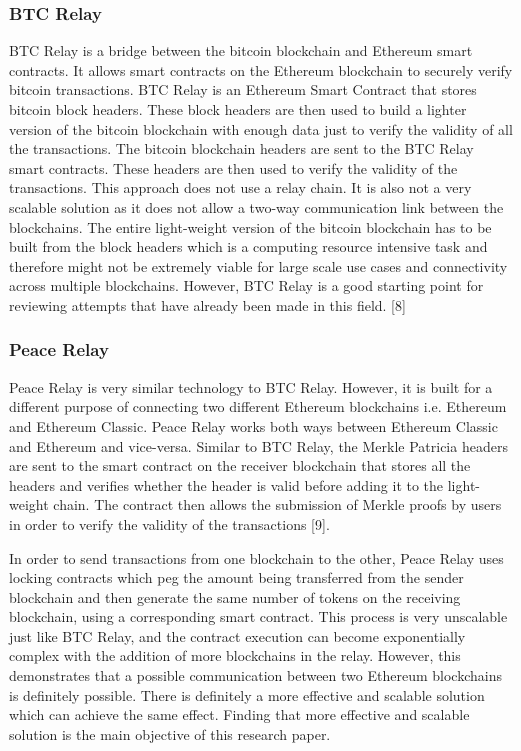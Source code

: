 \documentclass[a4paper,twoside,phd]{BYUPhys}
\begin{document}
\subsubsection{BTC Relay}
BTC Relay is a bridge between the bitcoin blockchain and Ethereum smart contracts. It allows smart contracts on the Ethereum blockchain to securely verify bitcoin transactions. BTC Relay is an Ethereum Smart Contract that stores bitcoin block headers. These block headers are then used to build a lighter version of the bitcoin blockchain with enough data just to verify the validity of all the transactions. The bitcoin blockchain headers are sent to the BTC Relay smart contracts. These headers are then used to verify the validity of the transactions. This approach does not use a relay chain. It is also not a very scalable solution as it does not allow a two-way communication link between the blockchains. The entire light-weight version of the bitcoin blockchain has to be built from the block headers which is a computing resource intensive task and therefore might not be extremely viable for large scale use cases and connectivity across multiple blockchains. However, BTC Relay is a good starting point for reviewing attempts that have already been made in this field. [8]
\subsubsection{Peace Relay}
Peace Relay is very similar technology to BTC Relay. However, it is built for a different purpose of connecting two different Ethereum blockchains i.e. Ethereum and Ethereum Classic. Peace Relay works both ways between Ethereum Classic and Ethereum and vice-versa. Similar to BTC Relay, the Merkle Patricia headers are sent to the smart contract on the receiver blockchain that stores all the headers and verifies whether the header is valid before adding it
to the light-weight chain. The contract then allows the submission of Merkle proofs by users in order to verify the validity of the transactions [9]. \par
In order to send transactions from one blockchain to the other, Peace Relay uses locking contracts which peg the amount being transferred from the sender blockchain and then generate the same number of tokens on the receiving blockchain, using a corresponding smart contract. This process is very unscalable just like BTC Relay, and the contract execution can become exponentially complex with the addition of more blockchains in the relay. However, this demonstrates that a possible communication between two Ethereum blockchains is definitely possible. There is definitely a more effective and scalable solution which can achieve the same effect. Finding that more effective and scalable solution is the main objective of this research paper.
\end{document}
